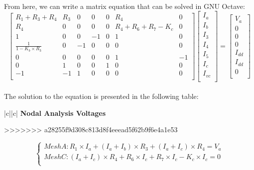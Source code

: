 \paragraph{}
From here, we can write a matrix equation that can be solved in GNU Octave:
\[
\begin{bmatrix}
R_1+R_3+R_4 & R_3 & 0 & 0 & 0 & R_4 & 0\\
R_4 & 0 & 0 & 0 & 0 & R_4+R_6+R_7-K_c & 0\\ 
1 & 0 & 0 & -1 & 0 & 1 & 0\\
\frac{1}{1-K_b \times R_3} & 0 & -1 & 0 & 0 & 0 & 0\\
0 & 0 & 0 & 0 & 0 & 1 & -1\\
0 & 1 & 0 & 0 & 1 & 0 & 0\\ 
-1 & -1 & 1 & 0 & 0 & 0 & 0\\ 
\end{bmatrix}
\begin{bmatrix}
I_a\\
I_b\\
I_3\\
I_4\\
I_5\\
I_c\\
I_{vc}\\
\end{bmatrix}
=
\begin{bmatrix}
V_a\\
0\\
0\\
0\\
I_{dd}\\
I_{dd}\\
0\\
\end{bmatrix}
\]

\paragraph{}
The solution to the equation is presented in the following table:

\begin{tabular}{|c||c|}
      \hline    
       {\bf Nodal Analysis Voltages} \\
      \hline

	
     
      \end{tabular}


>>>>>>> a28255f9d308c813d8f4eeead5f62b9f6e4a1e53

\[
\left\{\begin{matrix}
Mesh A: R_1 \times I_a+(I_a+I_b) \times R_3+(I_a+I_c) \times R_4=V_a\\
Mesh C:	(I_a+I_c) \times R_4+R_6 \times I_c+R_7 \times I_c-K_c \times I_c=0\\
\end{matrix}\right.
\]

